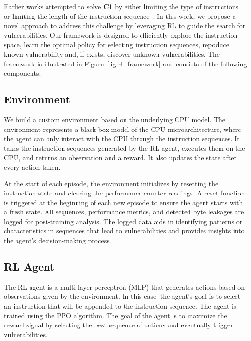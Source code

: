 Earlier works attempted to solve \textbf{C1} by either limiting the type of instructions~\cite{chakraborty2024shesha,oleksenko2023hide} or limiting the length of the instruction sequence~\cite{weber2021osiris}. In this work, we propose a novel approach to address this challenge by leveraging RL to guide the search for \Mi vulnerabilities. Our framework is designed to efficiently explore the instruction space, learn the optimal policy for selecting instruction sequences, repoduce known vulnerability and, if exists, discover unknown vulnerabilities. The framework is illustrated in Figure~\ref{fig:rl_framework} and consists of the following components:

\subsection{Environment} We build a custom environment based on the underlying CPU model. The environment represents a black-box model of the CPU microarchitecture, where the agent can only interact with the CPU through the instruction sequences. It takes the instruction sequences generated by the RL agent, executes them on the CPU, and returns an observation and a reward.
It also updates the state after every action taken. 


At the start of each episode, the environment initializes by resetting the instruction state and clearing the performance counter readings. A reset function is triggered at the beginning of each new episode to ensure the agent starts with a fresh state.
%
All sequences, performance metrics, and detected byte leakages are logged for post-training analysis. The logged data aids in identifying patterns or characteristics in sequences that lead to vulnerabilities and provides insights into the agent's decision-making process.

\subsection{RL Agent} The RL agent is a multi-layer perceptron (MLP) that generates actions based on observations given by the environment. In this case, the agent's goal is to select an instruction that will be appended to the instruction sequence. The agent is trained using the PPO algorithm. The goal of the agent is to maximize the reward signal by selecting the best sequence of actions and eventually trigger \Mi vulnerabilities.

